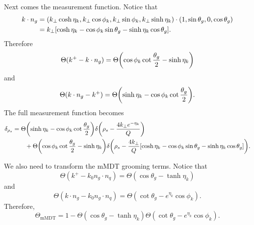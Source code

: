 \documentclass[12pt,twoside,class=../reedthesis, crop=false]{standalone}
\providecommand{\mMDT}{\mathrm{mMDT}}
\begin{document}
	Next comes the measurement function. Notice that
	\begin{equation}
	\begin{aligned}
		k \cdot n_g &= \qty(k_\perp \cosh\eta_k, k_\perp \cos\phi_k, k_\perp \sin\phi_k, k_\perp \sinh\eta_k) \cdot(1, \sin\theta_g, 0, \cos\theta_g) \\
		&= k_\perp \qty[\cosh\eta_k - \cos\phi_k \sin\theta_g - \sinh\eta_k \cos\theta_g].
	\end{aligned}
	\end{equation}
	Therefore
	\begin{equation}
		\Theta(k^+ - k \cdot n_g) = \Theta\qty(\cos\phi_k \cot\frac{\theta_g}{2} - \sinh\eta_k)
	\end{equation}
	and
	\begin{equation}
		\Theta(k \cdot n_g - k^+) = \Theta\qty(\sinh\eta_k - \cos\phi_k \cot\frac{\theta_g}{2}).
	\end{equation}
	The full measurement function becomes
	\begin{equation}\label{eq:measurement function specific coords}
	\begin{aligned}
		\delta_{\rho_s} &= \Theta\qty(\sinh\eta_k - \cos\phi_k \cot\frac{\theta_g}{2}) \delta\qty(\rho_s - \frac{4k_\perp e^{-\eta_k}}{Q}) \\
		&\qquad+ \Theta\qty(\cos\phi_k \cot\frac{\theta_g}{2} - \sinh\eta_k) \delta\qty(\rho_s - \frac{4k_\perp}{Q}\qty[\cosh\eta_k - \cos\phi_k \sin\theta_g - \sinh\eta_k \cos\theta_g]).
	\end{aligned}
	\end{equation}

	We also need to transform the mMDT grooming terms. Notice that
	\begin{equation}
		\Theta(k^+ - k_0 n_g \cdot n_q) = \Theta(\cos\theta_g - \tanh \eta_k)
	\end{equation}
	and
	\begin{equation}
		\Theta(k \cdot n_g - k_0 n_g \cdot n_q) = \Theta(\cot\theta_g - e^{\eta_k}\cos\phi_k).
	\end{equation}
	Therefore,
	\begin{equation}\label{eq:mMDT grooming specific coords}
		\Theta_{\mMDT} = 1 - \Theta(\cos\theta_g - \tanh \eta_k)\Theta(\cot\theta_g - e^{\eta_k}\cos\phi_k).
	\end{equation}
\end{document}
